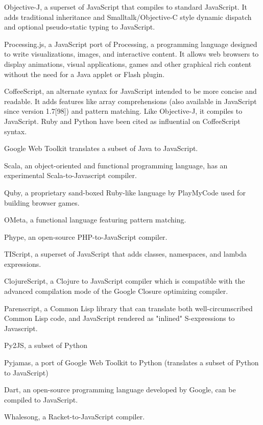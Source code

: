\begin{compactitem}
\item Objective-J, a superset of JavaScript that compiles to standard JavaScript. It adds traditional inheritance and Smalltalk/Objective-C style dynamic dispatch and optional pseudo-static typing to JavaScript.
\item Processing.js, a JavaScript port of Processing, a programming language designed to write visualizations, images, and interactive content. It allows web browsers to display animations, visual applications, games and other graphical rich content without the need for a Java applet or Flash plugin.
\item CoffeeScript, an alternate syntax for JavaScript intended to be more concise and readable. It adds features like array comprehensions (also available in JavaScript since version 1.7[98]) and pattern matching. Like Objective-J, it compiles to JavaScript. Ruby and Python have been cited as influential on CoffeeScript syntax.
\item Google Web Toolkit translates a subset of Java to JavaScript.
\item Scala, an object-oriented and functional programming language, has an experimental Scala-to-Javascript compiler.
\item Quby, a proprietary sand-boxed Ruby-like language by PlayMyCode used for building browser games.
\item OMeta, a functional language featuring pattern matching.
\item Phype, an open-source PHP-to-JavaScript compiler.
\item TIScript, a superset of JavaScript that adds classes, namespaces, and lambda expressions.
\item ClojureScript, a Clojure to JavaScript compiler which is compatible with the advanced compilation mode of the Google Closure optimizing compiler.
\item Parenscript, a Common Lisp library that can translate both well-circumscribed Common Lisp code, and JavaScript rendered as "inlined" S-expressions to Javascript.
\item Py2JS, a subset of Python
\item Pyjamas, a port of Google Web Toolkit to Python (translates a subset of Python to JavaScript)
\item Dart, an open-source programming language developed by Google, can be compiled to JavaScript.
\item Whalesong, a Racket-to-JavaScript compiler.

\end{compactitem}

